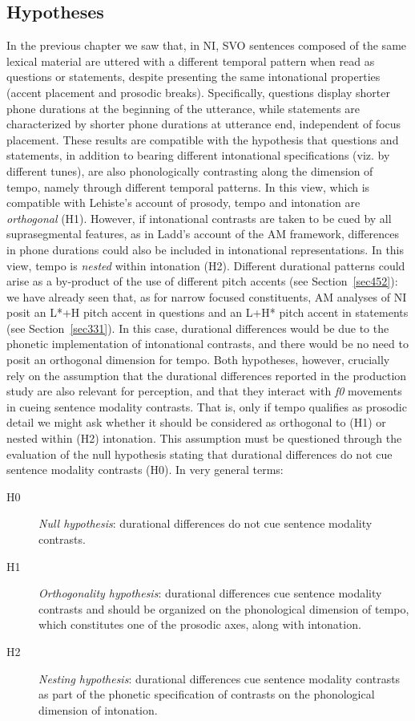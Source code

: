 \subsection{Hypotheses}\label{sec512}
In the previous chapter we saw that, in NI, SVO sentences composed of the same lexical material are uttered with a different temporal pattern when read as questions or statements, despite presenting the same intonational properties (accent placement and prosodic breaks). Specifically, questions display shorter phone durations at the beginning of the utterance, while statements are characterized by shorter phone durations at utterance end, independent of focus placement.
These results are compatible with the hypothesis that questions and statements, in addition to bearing different intonational specifications (viz. by different tunes), are also phonologically contrasting along the dimension of tempo, namely through different temporal patterns. In this view, which is compatible with Lehiste's account of prosody, tempo and intonation are \textit{orthogonal} (H1). However, if intonational contrasts are taken to be cued by all suprasegmental features, as in Ladd's account of the AM framework, differences in phone durations could also be included in intonational representations. In this view, tempo is \textit{nested} within intonation (H2). Different durational patterns could arise as a by-product of the use of different pitch accents (see Section~\ref{sec452}): we have already seen that, as for narrow focused constituents, AM analyses of NI posit an L*+H pitch accent in questions and an L+H* pitch accent in statements (see Section~\ref{sec331}). In this case, durational differences would be due to the phonetic implementation of intonational contrasts, and there would be no need to posit an orthogonal dimension for tempo.
Both hypotheses, however, crucially rely on the assumption that the durational differences reported in the production study are also relevant for perception, and that they interact with \textit{f0} movements in cueing sentence modality contrasts. That is, only if tempo qualifies as prosodic detail we might ask whether it should be considered as orthogonal to (H1) or nested within (H2) intonation. This assumption must be questioned through the evaluation of the null hypothesis stating that durational differences do not cue sentence modality contrasts (H0). In very general terms:
\begin{description}
\item[H0] \textit{Null hypothesis}: durational differences do not cue sentence modality contrasts.
\item[H1] \textit{Orthogonality hypothesis}: durational differences cue sentence modality contrasts and should be organized on the phonological dimension of tempo, which constitutes one of the prosodic axes, along with intonation.
\item[H2] \textit{Nesting hypothesis}: durational differences cue sentence modality contrasts as part of the phonetic specification of contrasts on the phonological dimension of intonation.
\end{description}
